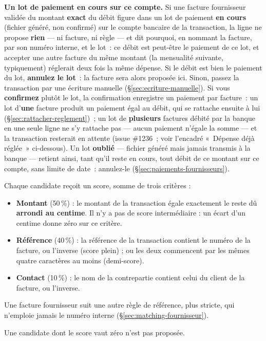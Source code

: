 \documentclass[a4paper,11pt,oneside]{article}
\begin{document}
\textbf{Un lot de paiement en cours sur ce compte.} Si une facture fournisseur validée du montant \textbf{exact} du débit figure dans un lot de paiement \textbf{en cours} (fichier généré, non confirmé) sur le compte bancaire de la transaction, la ligne ne propose \textbf{rien} --- ni facture, ni règle --- et dit pourquoi, en nommant la facture, par son numéro interne, et le lot~: ce débit est peut-être le paiement de ce lot, et accepter une autre facture du même montant (la mensualité suivante, typiquement) réglerait deux fois la même dépense. Si le débit est bien le paiement du lot, \textbf{annulez le lot}~: la facture sera alors proposée ici. Sinon, passez la transaction par une écriture manuelle (\S\ref{sec:ecriture-manuelle}). Si vous \textbf{confirmez} plutôt le lot, la confirmation enregistre un paiement par facture~: un lot d'\textbf{une} facture produit un paiement égal au débit, qui se rattache ensuite à lui (\S\ref{sec:rattacher-reglement})~; un lot de \textbf{plusieurs} factures débité par la banque en une seule ligne ne s'y rattache pas --- aucun paiement n'égale la somme --- et la transaction resterait en attente (issue \#1236~; voir l'encadré «~Dépense déjà réglée~» ci-dessous). Un lot \textbf{oublié} --- fichier généré mais jamais transmis à la banque --- retient ainsi, tant qu'il reste en cours, tout débit de ce montant sur ce compte, sans limite de date~: annulez-le (\S\ref{sec:paiements-fournisseurs}).

Chaque candidate reçoit un score, somme de trois critères :

\begin{itemize}
    \item \textbf{Montant} (50\,\%) : le montant de la transaction égale exactement le reste dû \textbf{arrondi au centime}. Il n'y a pas de score intermédiaire : un écart d'un centime donne zéro sur ce critère.
    \item \textbf{Référence} (40\,\%) : la référence de la transaction contient le numéro de la facture, ou l'inverse (score plein) ; ou les deux commencent par les mêmes quatre caractères au moins (demi-score).
    \item \textbf{Contact} (10\,\%) : le nom de la contrepartie contient celui du client de la facture, ou l'inverse.
\end{itemize}

Une facture fournisseur suit une autre règle de référence, plus stricte, qui n'emploie jamais le numéro interne (\S\ref{sec:matching-fournisseur}).

Une candidate dont le score vaut zéro n'est pas proposée.
\end{document}
